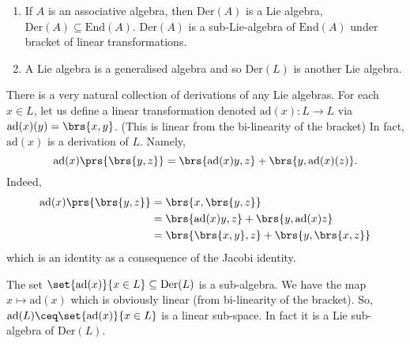 \documentclass[10pt,a4paper,twoside,openany,hidelinks]{book}
\begin{document}
\begin{example}
\begin{enumerate}
\item If $A$ is an associative algebra, then $\mathrm{Der}(A)$ is a Lie algebra, $\mathrm{Der}(A) \subseteq \mathrm{End}(A)$. $\mathrm{Der}(A)$ is a sub-Lie-algebra of $\mathrm{End}(A)$ under bracket of linear transformations.
\item A Lie algebra is a generalised algebra and so $\mathrm{Der}(L)$ is another Lie algebra.
\end{enumerate}
\end{example}
\begin{fact}[important]
There is a very natural collection of derivations of any Lie algebras.
For each $x \in L$, let us define a linear transformation denoted $\mathrm{ad}(x) \colon L \to L$ via
$\mathrm{ad}(x)(y) = \brs{x,y}$. (This is linear from the bi-linearity of the bracket)
In fact, $\mathrm{ad}(x)$ is a derivation of $L$. Namely,
\[\mathrm{ad}(x)\prs{\brs{y,z}} = \brs{\mathrm{ad}(x)y,z} + \brs{y, \mathrm{ad}(x)(z)}\text{.}\]
Indeed,
\begin{align*}
\mathrm{ad}(x)\prs{\brs{y,z}} &= \brs{x,\brs{y,z}} \\
&= \brs{\mathrm{ad}(x)y, z} + \brs{y, \mathrm{ad}(x)z} \\
&= \brs{\brs{x,y},z} + \brs{y,\brs{x,z}}
\end{align*}
which is an identity as a consequence of the Jacobi identity.
\end{fact}
\begin{conclusion}
The set $\set{\mathrm{ad}(x)}{x \in L} \subseteq \mathrm{Der}(L)$ is a sub-algebra.
We have the map $x \mapsto \mathrm{ad}(x)$ which is obviously linear (from bi-linearity of the bracket).
So, $\mathrm{ad}(L) \ceq \set{\mathrm{ad}(x)}{x \in L}$ is a linear sub-space.
In fact it is a Lie sub-algebra of $\mathrm{Der}(L)$.
\end{conclusion}
\end{document}
